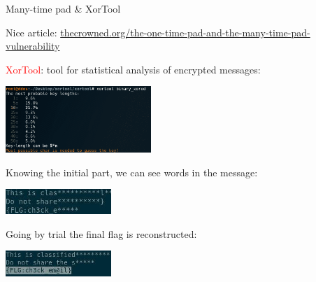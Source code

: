 \begin{frame}{Many-time pad \& XorTool}

  Nice article: 
  \textcolor{red}{\href{http://www.thecrowned.org/the-one-time-pad-and-the-many-time-pad-vulnerability}{thecrowned.org/the-one-time-pad-and-the-many-time-pad-vulnerability}}

  \smallskip
  
  \textcolor{red}{XorTool}: tool for statistical analysis of encrypted messages:

  \centerline{\includegraphics[width=5.5cm]{img/xortool}}

  \smallskip
  Knowing the initial part, we can see words in the message:
   
  \centerline{\includegraphics[width=4cm]{img/xor1}}

  Going by trial the final flag is reconstructed:
    
  \centerline{\includegraphics[width=4cm]{img/xor2}}


\end{frame}

